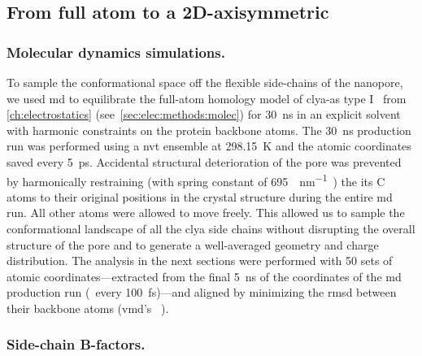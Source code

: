\subsection{From full atom to a 2D-axisymmetric}
%
\label{sec:transport:pore_geometry}
%

\subsubsection{Molecular dynamics simulations.}
%

To sample the conformational space off the flexible side-chains of the nanopore, we used \gls{md} to
equilibrate the full-atom homology model of \gls{clya-as} type I~\cite{Soskine-2013} from
\cref{ch:electrostatics} (see~\cref{sec:elec:methods:molec}) for \SI{30}{\ns} in an explicit solvent with
harmonic constraints on the protein backbone atoms. The \SI{30}{\ns} production run was performed using a
\gls{nvt} ensemble at \SI{298.15}{\kelvin} and the atomic coordinates saved every \SI{5}{\ps}. Accidental
structural deterioration of the pore was prevented by harmonically restraining (with spring constant of
\SI{695}{\pN\per\nm}~\cite{Bhattacharya-2011}) the its C\ta{} atoms to their original positions in the crystal
structure during the entire \gls{md} run. All other atoms were allowed to move freely. This allowed us to
sample the conformational landscape of all the \gls{clya} side chains without disrupting the overall structure
of the pore and to generate a well-averaged geometry and charge distribution. The analysis in the next
sections were performed with 50 sets of atomic coordinates---extracted from the final \SI{5}{\ns} of the
coordinates of the \gls{md} production run (\ie~every \SI{100}{\fs})---and aligned by minimizing the
\gls{rmsd} between their backbone atoms (\gls{vmd}'s ~\cite{Humphrey-1996}).

\subsubsection{Side-chain B-factors.}
%

